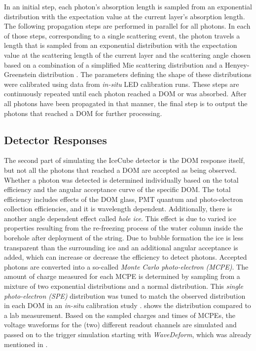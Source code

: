 In an initial step, each photon's absorption length is sampled from an exponential distribution with the expectation value at the current layer's absorption length. The following propagation steps are performed in parallel for all photons. In each of those steps, corresponding to a single scattering event, the photon travels a length that is sampled from an exponential distribution with the expectation value at the scattering length of the current layer and the scattering angle chosen based on a combination of a simplified Mie scattering distribution  and a Henyey-Greenstein distribution . The parameters defining the shape of these distributions were calibrated using data from \textit{in-situ} LED calibration runs. These steps are continuously repeated until each photon reached a DOM or was absorbed. After all photons have been propagated in that manner, the final step is to output the photons that reached a DOM for further processing.


\subsection{Detector Responses}

The second part of simulating the IceCube detector is the DOM response itself, but not all the photons that reached a DOM are accepted as being observed. Whether a photon was detected is determined individually based on the total efficiency and the angular acceptance curve of the specific DOM. The total efficiency includes effects of the DOM glass, PMT quantum and photo-electron collection efficiencies, and it is wavelength dependent. Additionally, there is another angle dependent effect called \textit{hole ice}. This effect is due to varied ice properties resulting from the re-freezing process of the water column inside the borehole after deployment of the string. Due to bubble formation the ice is less transparent than the surrounding ice and an additional angular acceptance is added, which can increase or decrease the efficiency to detect photons. Accepted photons are converted into a so-called \textit{Monte Carlo photo-electron (MCPE)}. The amount of charge measured for each MCPE is determined by sampling from a mixture of two exponential distributions and a normal distribution. This \textit{single photo-electron (SPE)} distribution was tuned to match the observed distribution in each DOM in an \textit{in-situ} calibration study .  shows the distribution compared to a lab measurement. Based on the sampled charges and times of MCPEs, the voltage waveforms for the (two) different readout channels are simulated and passed on to the trigger simulation starting with \textit{WaveDeform}, which was already mentioned in .

